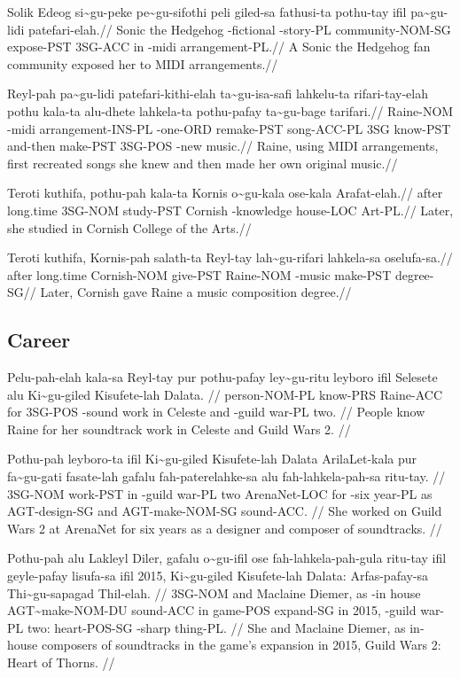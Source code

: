 \ex
\begingl
\gla  Solik Edeog si\~{}gu-peke pe\~{}gu-sifothi peli giled-sa fathusi-ta pothu-tay ifil pa\~{}gu-lidi patefari-elah.//
\glb  Sonic the Hedgehog \agradj{}-fictional \agradj{}-story-PL community-NOM-SG expose-PST 3SG-ACC in \agradj{}-midi arrangement-PL.//
\glft A Sonic the Hedgehog fan community exposed her to MIDI arrangements.//
\endgl
\xe

\ex
\begingl
\gla  Reyl-pah pa\~{}gu-lidi patefari-kithi-elah ta\~{}gu-isa-safi lahkelu-ta rifari-tay-elah pothu kala-ta alu-dhete lahkela-ta pothu-pafay ta\~{}gu-bage tarifari.//
\glb  Raine-NOM \agradj{}-midi arrangement-INS-PL \agradj{}-one-ORD remake-PST song-ACC-PL 3SG know-PST and-then make-PST 3SG-POS \agradj{}-new music.//
\glft Raine, using MIDI arrangements, first recreated songs she knew and then made her own original music.//
\endgl
\xe

\ex
\begingl
\gla  Teroti kuthifa,  pothu-pah kala-ta  Kornis o\~{}gu-kala ose-kala  Arafat-elah.//
\glb  after  long.time 3SG-NOM study-PST Cornish \agradj{}-knowledge house-LOC Art-PL.//
\glft Later, she studied in Cornish College of the Arts.//
\endgl
\xe

\ex
\begingl
\gla  Teroti kuthifa,  Kornis-pah salath-ta Reyl-tay  lah\~{}gu-rifari lahkela-sa oselufa-sa.//
\glb  after  long.time Cornish-NOM give-PST Raine-NOM  \agradj{}-music make-PST degree-SG//
\glft Later, Cornish gave Raine a music composition degree.//
\endgl
\xe

\subsection{Career}
\ex
\begingl
\gla Pelu-pah-elah kala-sa Reyl-tay pur pothu-pafay ley\~{}gu-ritu leyboro ifil Selesete alu Ki\~{}gu-giled Kisufete-lah Dalata. //
\glb person-NOM-PL know-PRS Raine-ACC for 3SG-POS \agradj{}-sound work in Celeste and \agradj{}-guild war-PL two. //
\glft People know Raine for her soundtrack work in Celeste and Guild Wars 2. //
\endgl
\xe

\ex
\begingl
\gla Pothu-pah leyboro-ta ifil Ki\~{}gu-giled Kisufete-lah Dalata  ArilaLet-kala pur fa\~{}gu-gati fasate-lah gafalu  fah-paterelahke-sa alu fah-lahkela-pah-sa  ritu-tay. //
\glb 3SG-NOM work-PST in \agradj{}-guild war-PL two  ArenaNet-LOC for \agradj{}-six year-PL as  AGT-design-SG and AGT-make-NOM-SG  sound-ACC. //
\glft She worked on Guild Wars 2 at ArenaNet for six years as a designer and composer of soundtracks. //
\endgl
\xe

\ex
\begingl
\gla Pothu-pah alu Lakleyl Diler, gafalu o\~{}gu-ifil ose fah-lahkela-pah-gula  ritu-tay ifil  geyle-pafay lisufa-sa ifil 2015, Ki\~{}gu-giled Kisufete-lah Dalata: Arfas-pafay-sa  Thi\~{}gu-sapagad Thil-elah. //
\glb 3SG-NOM and Maclaine Diemer, as \agradj{}-in house AGT\~{}make-NOM-DU  sound-ACC in  game-POS expand-SG in 2015, \agradj{}-guild war-PL two: heart-POS-SG  \agradj{}-sharp thing-PL. //
\glft She and Maclaine Diemer, as in-house composers of soundtracks in the game's expansion in 2015, Guild Wars 2: Heart of Thorns. //
\endgl
\xe

